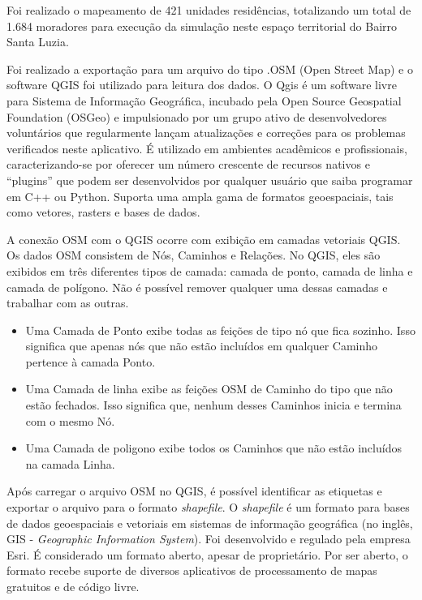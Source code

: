 Foi realizado o mapeamento de 421 unidades residências, totalizando um total de 1.684 moradores para execução da simulação neste espaço territorial do Bairro Santa Luzia.

Foi realizado a exportação para um arquivo do tipo .OSM (Open Street Map) e o software QGIS foi utilizado para leitura dos dados. O Qgis é um software livre para Sistema de Informação Geográfica, incubado pela Open Source Geospatial Foundation (OSGeo) e impulsionado por um grupo ativo de desenvolvedores voluntários que regularmente lançam atualizações e correções para os problemas verificados neste aplicativo. É utilizado em ambientes acadêmicos e profissionais, caracterizando-se por oferecer um número crescente de recursos nativos e “plugins” que podem ser desenvolvidos por qualquer usuário que saiba programar em C++ ou Python. Suporta uma ampla gama de formatos geoespaciais, tais como vetores, rasters e bases de dados. \cite{bruno2017aplicabilidade}

A conexão OSM com o QGIS ocorre com exibição em camadas vetoriais QGIS. Os dados OSM consistem de Nós, Caminhos e Relações. No QGIS, eles são exibidos em três diferentes tipos de camada: camada de ponto, camada de linha e camada de polígono. Não é possível remover qualquer uma dessas camadas e trabalhar com as outras. \cite{OpenStre2:online}

\begin{itemize}
\item Uma Camada de Ponto exibe todas as feições de tipo nó que fica sozinho. Isso significa que apenas nós que não estão incluídos em qualquer Caminho pertence à camada Ponto.
\item Uma Camada de linha exibe as feições OSM de Caminho do tipo que não estão fechados. Isso significa que, nenhum desses Caminhos inicia e termina com o mesmo Nó.
\item Uma Camada de poligono exibe todos os Caminhos que não estão incluídos na camada Linha.
\end{itemize}

Após carregar o arquivo OSM no QGIS, é possível identificar as etiquetas e exportar o arquivo para o formato \textit{shapefile}. O \textit{shapefile} é um formato para bases de dados geoespaciais e vetoriais em sistemas de informação geográfica (no inglês, GIS - \textit{Geographic Information System}). Foi desenvolvido e regulado pela empresa Esri. É considerado um formato aberto, apesar de proprietário. Por ser aberto, o formato recebe suporte de diversos aplicativos de processamento de mapas gratuitos e de código livre. 

